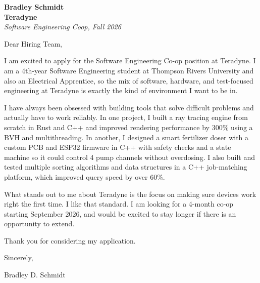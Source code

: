 \documentclass[11pt]{article}
\begin{document}
\textbf{Bradley Schmidt}\\
\vspace{0.5em}
\textbf{Teradyne}\\
\textit{Software Engineering Coop, Fall 2026}

Dear Hiring Team,

\par

I am excited to apply for the Software Engineering Co-op position at Teradyne. I am a 4th-year Software Engineering student at Thompson Rivers University and also an Electrical Apprentice, so the mix of software, hardware, and test-focused engineering at Teradyne is exactly the kind of environment I want to be in.

\par

I have always been obsessed with building tools that solve difficult problems and actually have to work reliably. In one project, I built a ray tracing engine from scratch in Rust and C++ and improved rendering performance by 300\% using a BVH and multithreading. In another, I designed a smart fertilizer doser with a custom PCB and ESP32 firmware in C++ with safety checks and a state machine so it could control 4 pump channels without overdosing. I also built and tested multiple sorting algorithms and data structures in a C++ job-matching platform, which improved query speed by over 60\%.

\par

What stands out to me about Teradyne is the focus on making sure devices work right the first time. I like that standard. I am looking for a 4-month co-op starting September 2026, and would be excited to stay longer if there is an opportunity to extend.

\par

Thank you for considering my application.

\par

Sincerely,

\par

Bradley D. Schmidt
\end{document}
